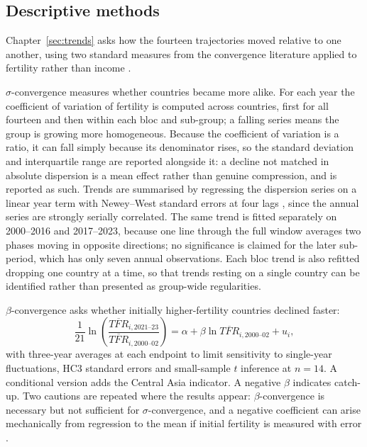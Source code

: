 \subsection{Descriptive methods}
\label{sec:descriptive-methods}

Chapter~\ref{sec:trends} asks how the fourteen trajectories moved relative to one another, using two standard measures from the convergence literature applied to fertility rather than income \parencite{barro1992,salaimartin1996}.

$\sigma$-convergence measures whether countries became more alike. For each year the coefficient of variation of fertility is computed across countries, first for all fourteen and then within each bloc and sub-group; a falling series means the group is growing more homogeneous. Because the coefficient of variation is a ratio, it can fall simply because its denominator rises, so the standard deviation and interquartile range are reported alongside it: a decline not matched in absolute dispersion is a mean effect rather than genuine compression, and is reported as such. Trends are summarised by regressing the dispersion series on a linear year term with Newey--West standard errors at four lags \parencite{newey1987}, since the annual series are strongly serially correlated. The same trend is fitted separately on 2000--2016 and 2017--2023, because one line through the full window averages two phases moving in opposite directions; no significance is claimed for the later sub-period, which has only seven annual observations. Each bloc trend is also refitted dropping one country at a time, so that trends resting on a single country can be identified rather than presented as group-wide regularities.

$\beta$-convergence asks whether initially higher-fertility countries declined faster:
\begin{equation}
\frac{1}{21}\ln\!\left(\frac{\overline{TFR}_{i,2021\text{--}23}}{\overline{TFR}_{i,2000\text{--}02}}\right)
= \alpha + \beta \ln \overline{TFR}_{i,2000\text{--}02} + u_i ,
\label{eq:beta}
\end{equation}
with three-year averages at each endpoint to limit sensitivity to single-year fluctuations, HC3 standard errors and small-sample $t$ inference at $n=14$. A conditional version adds the Central Asia indicator. A negative $\beta$ indicates catch-up. Two cautions are repeated where the results appear: $\beta$-convergence is necessary but not sufficient for $\sigma$-convergence, and a negative coefficient can arise mechanically from regression to the mean if initial fertility is measured with error \parencite{quah1993}.

